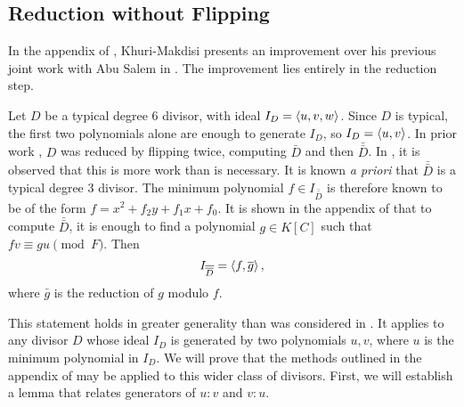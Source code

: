 
\subsection{Reduction without Flipping}
\label{sec_reduction}

In the appendix of \cite{kmakdisi18}, Khuri-Makdisi presents an improvement
over his previous joint work with Abu Salem in \cite{salem07}.
The improvement lies entirely in the reduction step.

Let $D$ be a typical degree 6 divisor, with ideal $I_D = \left\langle u,v,w \right\rangle$.
Since $D$ is typical, the first two polynomials alone are enough to generate $I_D$,
so $I_D = \left\langle u,v \right\rangle$.
In prior work \cite{salem07}, $D$ was reduced by flipping twice, computing $\bar D$ and then $\bar{\bar D}$.
In \cite{kmakdisi18}, it is observed that this is more work than is necessary.
It is known \emph{a priori} that $\bar{\bar D}$ is a typical degree 3 divisor.
The minimum polynomial $f \in I_{\bar{\bar D}}$ is therefore known to be of the form $f = x^2 + f_2y + f_1x + f_0$.
It is shown in the appendix of \cite{kmakdisi18} that to compute $\bar{\bar D}$,
it is enough to find a polynomial $g \in K[C]$ such that $fv \equiv gu \pmod F$.
Then
  \[ I_{\overline{\overline D}} = \left\langle f, \overline g \right\rangle, \]
where $\bar g$ is the reduction of $g$ modulo $f$.

This statement holds in greater generality than was considered in \cite{kmakdisi18}.
It applies to any divisor $D$ whose ideal $I_D$ is generated by two polynomials $u,v$,
where $u$ is the minimum polynomial in $I_D$.
We will prove that the methods outlined in the appendix of \cite{kmakdisi18}
may be applied to this wider class of divisors.
First, we will establish a lemma that relates generators of $u : v$ and $v : u$.

